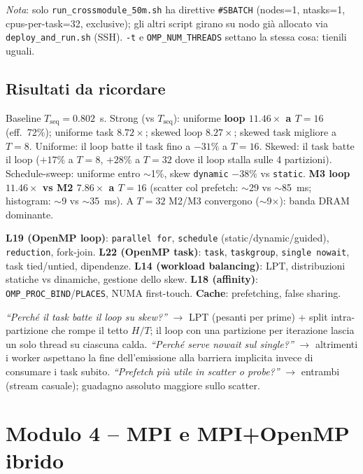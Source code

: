 \documentclass[11pt,a4paper]{article}
\begin{document}
\emph{Nota}: solo \texttt{run\_crossmodule\_50m.sh} ha direttive \texttt{\#SBATCH} (nodes=1, ntasks=1, cpus-per-task=32, exclusive); gli altri script girano su nodo già allocato via \texttt{deploy\_and\_run.sh} (SSH). \texttt{-t} e \texttt{OMP\_NUM\_THREADS} settano la stessa cosa: tienili uguali.

\subsection{Risultati da ricordare}

Baseline $T_\text{seq}=0.802$~s. Strong (vs $T_\text{seq}$): uniforme \textbf{loop $11.46\times$ a $T=16$} (eff.\ 72\%); uniforme task $8.72\times$; skewed loop $8.27\times$; skewed task migliore a $T=8$. Uniforme: il loop batte il task fino a $-31\%$ a $T=16$. Skewed: il task batte il loop ($+17\%$ a $T=8$, $+28\%$ a $T=32$ dove il loop stalla sulle 4 partizioni). Schedule-sweep: uniforme entro $\sim$1\%, skew \texttt{dynamic} $-38\%$ vs \texttt{static}. \textbf{M3 loop $11.46\times$ vs M2 $7.86\times$ a $T=16$} (scatter col prefetch: $\sim$29 vs $\sim$85~ms; histogram: $\sim$9 vs $\sim$35~ms). A $T=32$ M2/M3 convergono ($\sim$9$\times$): banda DRAM dominante.

\begin{theorybox}
\textbf{L19 (OpenMP loop)}: \texttt{parallel for}, \texttt{schedule} (static/dynamic/guided), \texttt{reduction}, fork-join. \textbf{L22 (OpenMP task)}: \texttt{task}, \texttt{taskgroup}, \texttt{single nowait}, task tied/untied, dipendenze. \textbf{L14 (workload balancing)}: LPT, distribuzioni statiche vs dinamiche, gestione dello skew. \textbf{L18 (affinity)}: \texttt{OMP\_PROC\_BIND}/\texttt{PLACES}, NUMA first-touch. \textbf{Cache}: prefetching, false sharing.
\end{theorybox}

\begin{qbox}[M3]
\emph{``Perché il task batte il loop su skew?''} $\to$ LPT (pesanti per prime) + split intra-partizione che rompe il tetto $H/T$; il loop con una partizione per iterazione lascia un solo thread su ciascuna calda. \emph{``Perché serve nowait sul single?''} $\to$ altrimenti i worker aspettano la fine dell'emissione alla barriera implicita invece di consumare i task subito. \emph{``Prefetch più utile in scatter o probe?''} $\to$ entrambi (stream casuale); guadagno assoluto maggiore sullo scatter.
\end{qbox}
\section{Modulo 4 -- MPI e MPI+OpenMP ibrido}
\end{document}
